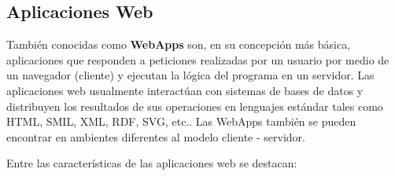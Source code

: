 \subsection{Aplicaciones Web}

También conocidas como \textbf{WebApps} son, en su concepción más básica, aplicaciones que responden a peticiones realizadas por un usuario por medio de un navegador (cliente) y ejecutan la lógica del programa en un servidor. Las aplicaciones web usualmente interactúan con sistemas de bases de datos y distribuyen los resultados de sus operaciones en lenguajes estándar tales como HTML, SMIL, XML,  RDF, SVG, etc.\cite{jackson2005}. Las WebApps también se pueden encontrar en ambientes diferentes al modelo cliente - servidor\cite{bos2004}. 

Entre las características de las aplicaciones web se destacan\cite{bos2004}:

